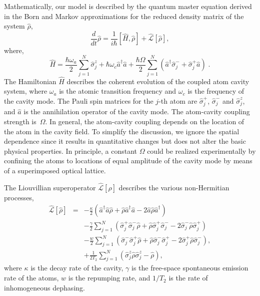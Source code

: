 \documentclass[aps,
twocolumn,
showpacs,
superscriptaddress,groupedaddress]{revtex4}
\begin{document}
Mathematically, our model is described by the quantum master equation
derived in the Born and Markov approximations for the reduced density
matrix of the system $\hat{\rho}$,
\begin{equation}
  \frac{d}{dt} \hat{\rho} =
  \frac{1}{i \hbar} \left[ \hat{H}, \hat{\rho} \right] +
  \hat{\mathcal{L}}\left[ \hat{\rho} \right],
\label{ME1Crossover}
\end{equation}
where,
\begin{equation}
\hat{H} = \frac{\hbar \omega_a}{2} \sum_{j=1}^{N} \hat{\sigma}^{z}_{j}
+ \hbar \omega_c \hat{a}^{\dagger}\hat{a}
+ \frac{\hbar \Omega}{2}  \sum_{j=1}^{N} \left(
    \hat{a}^{\dagger} \hat{\sigma}^{-}_{j} +
    \hat{\sigma}^{+}_{j} \hat{a} \right)\;.
\end{equation}
The Hamiltonian $\hat{H}$ describes the coherent evolution of the
coupled atom cavity system, where $\omega_{a}$ is the atomic
transition frequency and $\omega_c$ is the frequency of the cavity
mode. The Pauli spin matrices for the $j$-th atom are
$\hat{\sigma}_j^{+}$, $\hat{\sigma}_j^{-}$ and $\hat{\sigma}_j^{z}$,
and $\hat{a}$ is the annihilation operator of the cavity mode. The
atom-cavity coupling strength is~$\Omega$.  In general, the
atom-cavity coupling depends on the location of the atom in the cavity
field.  To simplify the discussion, we ignore the spatial dependence
since it results in quantitative changes but does not alter the basic
physical properties.  In principle, a constant $\Omega$ could be
realized experimentally by confining the atoms to locations of equal
amplitude of the cavity mode by means of a superimposed optical
lattice.

The Liouvillian superoperator
$\hat{\mathcal{L}}\left[ \hat{\rho} \right]$ describes the various
non-Hermitian processes,
\begin{eqnarray}
\hat{\mathcal{L}}\left[ \hat{\rho} \right] &=&
  -\frac{\kappa}{2}
  \left(
    \hat{a}^{\dagger} \hat{a} \hat{\rho}
    + \hat{\rho}  \hat{a}^{\dagger} \hat{a}
    - 2\hat{a} \hat{\rho} \hat{a}^{\dagger}
  \right)
\nonumber
\\
 &&-\frac{\gamma}{2} \sum_{j=1}^N
  \left(
   \hat{\sigma}_{j}^{+} \hat{\sigma}_{j}^{-} \hat{\rho}
   + \hat{\rho} \hat{\sigma}_{j}^{+} \hat{\sigma}_{j}^{-}
   - 2\hat{\sigma}_{j}^{-} \hat{\rho} \hat{\sigma}_{j}^{+}
  \right)
\nonumber
\\
 &&-\frac{w}{2} \sum_{j=1}^N
  \left(
   \hat{\sigma}_{j}^{-} \hat{\sigma}_{j}^{+} \hat{\rho}
   + \hat{\rho} \hat{\sigma}_{j}^{-} \hat{\sigma}_{j}^{+}
   - 2\hat{\sigma}_{j}^{+} \hat{\rho}  \hat{\sigma}_{j}^{-}
  \right),
\nonumber
\\
 &&+\frac{1}{2T_2} \sum_{j=1}^N
  \left(
   \hat{\sigma}_{j}^{z} \hat{\rho}  \hat{\sigma}_{j}^{z} - \hat{\rho}
  \right),
\end{eqnarray}
where $\kappa$ is the decay rate of the cavity, $\gamma$ is the
free-space spontaneous emission rate of the atoms, $w$ is the
repumping rate, and $1/{T_2}$ is the rate of inhomogeneous dephasing.
\end{document}
